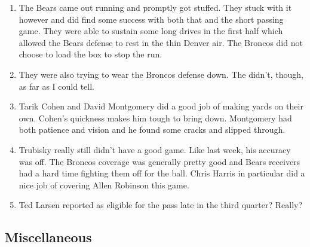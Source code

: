 \documentclass[11pt]{article}
\begin{document}
  \begin{enumerate}
  \item The Bears came out running and promptly got stuffed.  They stuck with it however and did find some success with both that and the short passing game.  They were able to sustain some long drives in the first half which allowed the Bears defense to rest in the thin Denver air.  The Broncos did not choose to load the box to stop the run.
  \item They were also trying to wear the Broncos defense down.  The didn't, though, as far as I could tell.
  \item Tarik Cohen and David Montgomery did a good job of making yards on their own.  Cohen's quickness makes him tough to bring down.  Montgomery had both patience and vision and he found some cracks and slipped through.
  \item Trubisky really still didn't have a good game.  Like last week, his accuracy was off.  The Broncos coverage was generally pretty good and Bears receivers had a hard time fighting them off for the ball. Chris Harris in particular did a nice job of covering Allen Robinson this game.
  \item Ted Larsen reported as eligible for the pass late in the third quarter?  Really?
  \end{enumerate}

  \subsection*{Miscellaneous}
\end{document}
